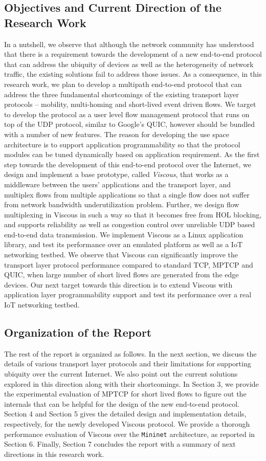 \subsection{Objectives and Current Direction of the Research Work}
In a nutshell, we observe that although the network community has understood that there is a requirement towards the development of a new end-to-end protocol that can address the ubiquity of devices as well as the heterogeneity of network traffic, the existing solutions fail to address those issues. As a consequence, in this research work, we plan to develop a multipath end-to-end protocol that can address the three fundamental shortcomings of the existing transport layer protocols -- mobility, multi-homing and short-lived event driven flows. We target to develop the protocol as a user level flow management protocol that runs on top of the UDP protocol, similar to Google's QUIC, however should be bundled with a number of new features. The reason for developing the use space architecture is to support application programmability so that the protocol modules can be tuned dynamically based on application requirement. As the first step towards the development of this end-to-end protocol over the Internet, we design and implement a base prototype, called \textit{Viscous}, that works as a middleware between the users' applications and the transport layer, and multiplex flows from multiple applications so that a single flow does not suffer from network bandwidth underutilization problem. Further, we design flow multiplexing in Viscous in such a way so that it becomes free from HOL blocking, and supports reliability as well as congestion control over unreliable UDP based end-to-end data transmission. We implement Viscous as a Linux application library, and test its performance over an emulated platform as well as a IoT networking testbed. We observe that Viscous can significantly improve the transport layer protocol performance compared to standard TCP, MPTCP and QUIC, when large number of short lived flows are generated from the edge devices. Our next target towards this direction is to extend Viscous with application layer programmability support and test its performance over a real IoT networking testbed. 

\subsection{Organization of the Report}
The rest of the report is organized as follows. In the next section, we discuss the details of various transport layer protocols and their limitations for supporting ubiquity over the current Internet. We also point out the current solutions explored in this direction along with their shortcomings. In Section 3, we provide the experimental evaluation of MPTCP for short lived flows to figure out the internals that can be helpful for the design of the new end-to-end protocol. Section 4 and Section 5 gives the detailed design and implementation details, respectively, for the newly developed Viscous protocol. We provide a thorough performance evaluation of Viscous over the \texttt{Mininet} architecture, as reported in Section 6. Finally, Section 7 concludes the report with a summary of next directions in this research work. 

